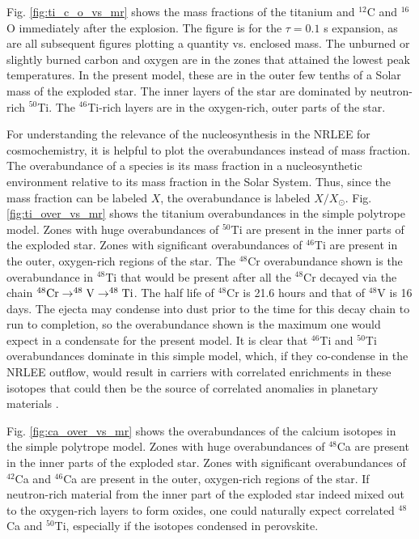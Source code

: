 \documentclass[preprint]{revtex4-2}
\begin{document}
Fig. \ref{fig:ti_c_o_vs_mr} shows the mass fractions of the titanium 
and $^{12}$C and $^{16}$O immediately after the explosion.  The figure is
for the $\tau = 0.1$ s expansion, as are all subsequent figures plotting
a quantity vs. enclosed mass.  The unburned
or slightly burned carbon and oxygen are in the zones that attained the
lowest peak temperatures.  In the present model, these are in the outer
few tenths of a Solar mass of the exploded star.
The inner layers of the star are dominated by
neutron-rich $^{50}$Ti.  The $^{46}$Ti-rich layers are in the oxygen-rich,
outer parts of the star.

For understanding the relevance of the nucleosynthesis in the NRLEE for
cosmochemistry, it is helpful to plot the overabundances instead of mass
fraction.  The overabundance of a species is its mass fraction in a
nucleosynthetic environment relative to its mass fraction in the Solar System.
Thus, since the mass fraction can be labeled $X$, the overabundance is
labeled $X / X_\odot$.  Fig. \ref{fig:ti_over_vs_mr} shows the titanium
overabundances in the simple polytrope model.
Zones with huge overabundances of $^{50}$Ti are present in the
inner parts of the exploded star.   Zones with significant overabundances
of $^{46}$Ti are present in the outer, oxygen-rich regions of the star.
The $^{48}$Cr overabundance shown
is the overabundance in $^{48}$Ti that would be present after all the
$^{48}$Cr decayed via the chain $^{48}\rm{Cr} \to ^{48}\rm{V} \to ^{48}\rm{Ti}$.
The half life of $^{48}$Cr is 21.6 hours and that of $^{48}$V is 16 days.
The ejecta may condense into dust prior to the time for this decay chain
to run to completion, so the overabundance shown is the maximum one would
expect in a condensate for the present model.
It is clear that $^{46}$Ti and $^{50}$Ti overabundances dominate in this
simple model, which, if they co-condense in the NRLEE outflow, would result
in carriers with correlated enrichments in these isotopes that could then
be the source of correlated anomalies in planetary materials
\cite{2009Sci...324..374T}.

Fig. \ref{fig:ca_over_vs_mr} shows the overabundances of the calcium isotopes
in the simple polytrope model.
Zones with huge overabundances of $^{48}$Ca are present in the
inner parts of the exploded star.   Zones with significant overabundances
of $^{42}$Ca and $^{46}$Ca  are present in the outer, oxygen-rich regions of
the star.  If neutron-rich material from the inner part of the exploded
star indeed mixed out to the oxygen-rich layers to form oxides, one could
naturally expect correlated $^{48}$Ca and $^{50}$Ti, especially if the
isotopes condensed in perovskite.
\end{document}
